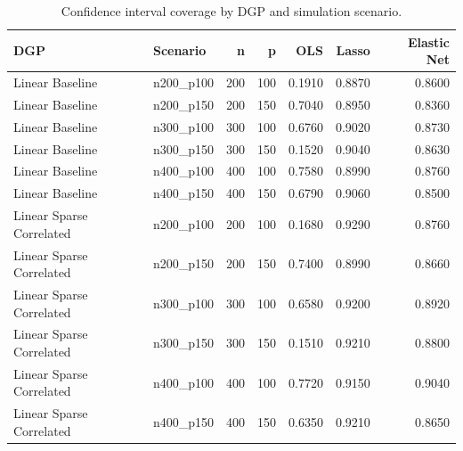 \begin{table}[!htbp]
\centering
\caption{Confidence interval coverage by DGP and simulation scenario.}
\label{tab:coverage-by-dgp}
\begin{tabular}{l l r r r r r}
 \hline
DGP & Scenario & n & p & OLS & Lasso & Elastic Net \\
 \hline
Linear Baseline & n200\_p100 & 200 & 100 & 0.1910 & 0.8870 & 0.8600 \\
Linear Baseline & n200\_p150 & 200 & 150 & 0.7040 & 0.8950 & 0.8360 \\
Linear Baseline & n300\_p100 & 300 & 100 & 0.6760 & 0.9020 & 0.8730 \\
Linear Baseline & n300\_p150 & 300 & 150 & 0.1520 & 0.9040 & 0.8630 \\
Linear Baseline & n400\_p100 & 400 & 100 & 0.7580 & 0.8990 & 0.8760 \\
Linear Baseline & n400\_p150 & 400 & 150 & 0.6790 & 0.9060 & 0.8500 \\
Linear Sparse Correlated & n200\_p100 & 200 & 100 & 0.1680 & 0.9290 & 0.8760 \\
Linear Sparse Correlated & n200\_p150 & 200 & 150 & 0.7400 & 0.8990 & 0.8660 \\
Linear Sparse Correlated & n300\_p100 & 300 & 100 & 0.6580 & 0.9200 & 0.8920 \\
Linear Sparse Correlated & n300\_p150 & 300 & 150 & 0.1510 & 0.9210 & 0.8800 \\
Linear Sparse Correlated & n400\_p100 & 400 & 100 & 0.7720 & 0.9150 & 0.9040 \\
Linear Sparse Correlated & n400\_p150 & 400 & 150 & 0.6350 & 0.9210 & 0.8650 \\
 \hline
\end{tabular}
\end{table}



